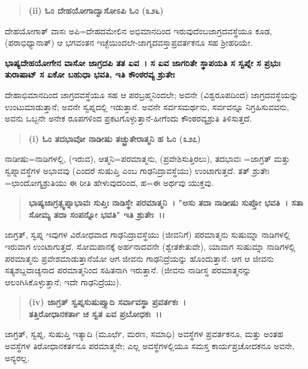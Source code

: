 \begin{verse}
\textbf{(ii) ಓಂ ದೇಹಯೋಗಾದ್ವಾಸೋಽಪಿ ಓಂ (೩\enginline{-}೨\enginline{-}೬)}
\end{verse}

ದೇಹಯೋಗಾತ್ ವಾಸಃ ಅಪಿ=ದೇಹದಮೇಲಿನ ಅಭಿಮಾನದಿಂದ ಇರುವುದೆಂಬ\break ಜಾಗ್ರದವಸ್ಥೆಯೂ ಕೂಡ, (ಪರಾಭಿಧ್ಯಾನಾತ್) ಆ ಭಗವಂತನ ಇಚ್ಛೆಯಿಂದಲೇ-ಜಾಗೃದ\-ವಸ್ತಾಪ್ರವರ್ತಕನೂ ಸಹ ಶ‍್ರೀಹರಿಯೇ.

\textbf{ಭಾಷ್ಯ\enginline{-}ದೇಹಯೋಗೇನ ವಾಸೋ ಜಾಗ್ರದಪಿ ತತ ಏವ~। ಸ ಏವ ಜಾಗರಿತೇ ಸ್ಥಾಪಯತಿ ಸ ಸ್ವಪ್ನೇ ಸ ಪ್ರಭುಃ ತುರಾಷಾಟ್ ಸ ಏಕೋ ಬಹುಧಾ ಭವತಿ, ಇತಿ ಕೌಂಠರವ್ಯ ಶ್ರುತೇಃ\enginline{-}}

ದೇಹಾಭಿಮಾನದಿಂದ ಜಾಗ್ರದವಸ್ಥೆಯೂ ಸಹ ಆ ಪರಬ್ರಹ್ಮನಿಂದಲೇ; ಅವನೇ (ವಿಶ್ವರೂಪದಿಂದ) ಜಾಗ್ರದವಸ್ಥೆಯನ್ನು ಉಂಟುಮಾಡುತ್ತಾನೆ; ಅವನೇ ಸ್ವಪ್ನದಲ್ಲಿ ಇಡುತ್ತಾನೆ. ಅವನೇ ಸರ್ವಸಮರ್ಥನು, ಸರ್ವವನ್ನೂ ನಿಗ್ರಹಿಸುವವನು, ಅವನು ಒಬ್ಬನೇ ಅನೇಕ ರೂಪಗಳಿಂದ ಪ್ರಕಟಗೊಳ್ಳುತ್ತಾನೆ-ಹೀಗೆಂದು ಕೌಂಠರವ್ಯಶ್ರುತಿ ತಿಳಿಸುತ್ತದೆ.

\begin{verse}
\textbf{(i) ಓಂ ತದಭಾವೋ ನಾಡೀಷು ತಚ್ಛ್ರುತೇರಾತ್ಮನಿ ಹ ಓಂ (೩\enginline{-}೨\enginline{-}೭)}
\end{verse}

ನಾಡೀಷು=ನಾಡಿಗಳಲ್ಲಿ, (ಇರುವ), ಆತ್ಮನಿ=ಪರಮಾತ್ಮನು, (ಪ್ರವೇಶಿಸುತ್ತಿರಲು), ತದಭಾವಃ =ಜಾಗ್ರತ್ ಮತ್ತು ಸ್ವಪ್ನಾವಸ್ಥೆಗಳ ಅಭಾವವು (ಎಂದರೆ ಸುಷುಪ್ತಿ ಎಂಬ ಗಾಢನಿದ್ರಾ\-ವಸ್ಥೆಯು) ಉಂಟಾಗುತ್ತದೆ. ತತ್ ಶ್ರುತೇಃ =ಛಾಂದೋಗ್ಯಶ್ರುತಿಯು ಈ ರೀತಿ ಹೇಳುವುದರಿಂದ, ಹ=ಈ ಅರ್ಥವು ಯುಕ್ತವು.

\begin{verse}
\textbf{ಭಾಷ್ಯ\enginline{-}ಜಾಗ್ರತ್ಸ್ವಪ್ನಾಭಾವಃ ಸುಪ್ತಿಃ ನಾಡಿಸ್ಥೇ ಪರಮಾತ್ಮನಿ~। "ಅಸು ತದಾ ನಾಡೀಷು ಸುಪ್ತೋ ಭವತಿ~। ಸತಾ ಸೋಮ್ಯ ತದಾ ಸಂಪನ್ನೋ ಭವತಿ" ಇತಿ ಶ್ರುತೇಃ~।।}
\end{verse}

ಜಾಗ್ರತ್, ಸ್ವಪ್ನ ಇವುಗಳ ವಿರೋಧವಾದ ಗಾಢನಿದ್ರಾವಸ್ಥೆಯು (ಜೀವನಿಗೆ) ಪರಮಾತ್ಮನು ಸುಷುಮ್ನಾ ನಾಡಿಗಳಲ್ಲಿ ಇರುವಾಗ ಉಂಟಾಗುತ್ತದೆ. ಸೋಮಪಾನಕ್ಕೆ ಅರ್ಹನಾದವನೇ (ಶ್ವೇತಕೇತುವೇ), ಯಾವಾಗ ಸುಷುಮ್ನಾ ನಾಡಿಗಳಲ್ಲಿ ಪರಮಾತ್ಮನು ಪ್ರವೇಶಮಾಡುತ್ತಾ\-ನೆಯೋ ಆಗ ಜೀವನು ಗಾಢನಿದ್ರೆಯನ್ನು ಹೊಂದುತ್ತಾನೆ. ಆಗ ಆ ಜೀವನು ಸತ್ಯಶಬ್ದವಾಚ್ಯನಾದ ಪರಮಾತ್ಮನಿಂದ ಸಹಿತನಾಗಿ ಇರುತ್ತಾನೆ. (ಜೀವನು ನಾಡೀಸ್ಥ ಪರಮಾತ್ಮನನ್ನು ಆಲಂಗಿಸಿ\-ಕೊಳ್ಳುತ್ತಾನೆ; ಇದೇ ಗಾಢನಿದ್ರೆಯು).

\begin{verse}
\textbf{(iv) ಜಾಗ್ರತ್ ಸ್ವಪ್ನಸುಷುಪ್ತ್ಯಾದಿ ಸರ್ವಾವಸ್ಥಾ ಪ್ರವರ್ತಕಃ~।}\\\textbf{ತತ್ತಿರೋಧಾನಕರ್ತಾ ಚ ಸ್ವತ ಏವ ಪ್ರಬೋಧಕಃ~।।}
\end{verse}


ಜಾಗ್ರತ್, ಸ್ವಪ್ನ, ಸುಷುಪ್ತಿ ಇತ್ಯಾದಿ (ಮೂರ್ಛೆ, ಮರಣ, ಸಮಾಧಿ) ಅವಸ್ಥೆಗಳ ಪ್ರವರ್ತಕನೂ, ಮತ್ತು ಅಂತಹ ಅವಸ್ಥೆಗಳ ತಿರೋಧಾನಕರ್ತನೂ ಪರಮಾತ್ಮನೇ; ಎಲ್ಲ ಅವಸ್ಥೆಗಳಲ್ಲಿಯೂ ಸಮಸ್ತ ಕಾರ್ಯಪ್ರಚೋದಕನೂ ಅವನೇ, ಅನ್ಯರಲ್ಲ.

